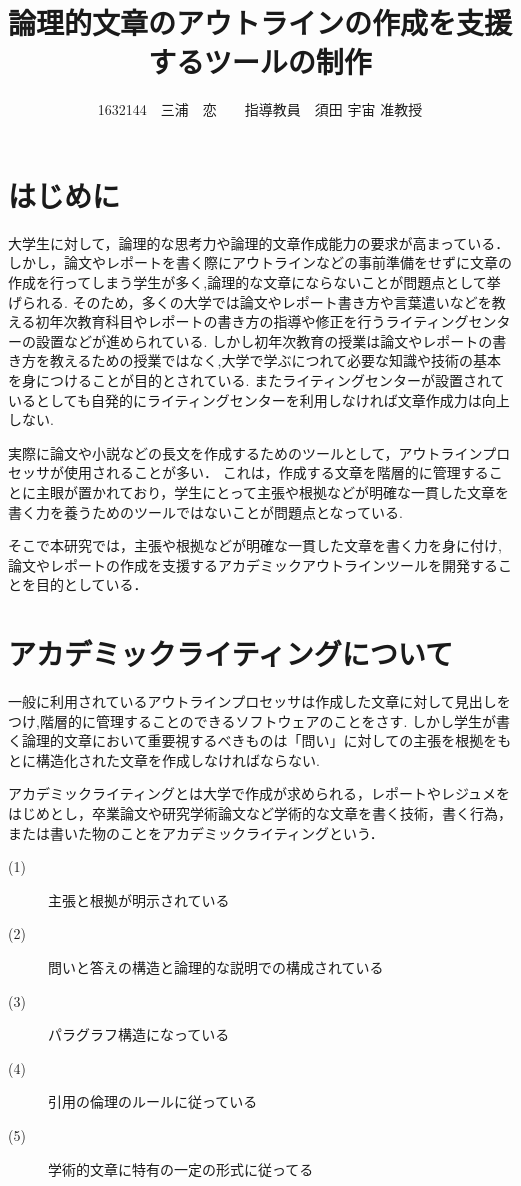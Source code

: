 \documentclass[twocolumn,10pt,a4j]{jsarticle}
\title{論理的文章のアウトラインの作成を支援するツールの制作}
\author{1632144　三浦　恋　　指導教員　須田 宇宙 准教授}
\date{}
\begin{document}
\maketitle

\section{はじめに}

大学生に対して，論理的な思考力や論理的文章作成能力の要求が高まっている．
しかし，論文やレポートを書く際にアウトラインなどの事前準備をせずに文章の作成を行ってしまう学生が多く,論理的な文章にならないことが問題点として挙げられる.
そのため，多くの大学では論文やレポート書き方や言葉遣いなどを教える初年次教育科目やレポートの書き方の指導や修正を行うライティングセンターの設置などが進められている.
しかし初年次教育の授業は論文やレポートの書き方を教えるための授業ではなく,大学で学ぶにつれて必要な知識や技術の基本を身につけることが目的とされている.
またライティングセンターが設置されているとしても自発的にライティングセンターを利用しなければ文章作成力は向上しない.

実際に論文や小説などの長文を作成するためのツールとして，アウトラインプロセッサが使用されることが多い．
これは，作成する文章を階層的に管理することに主眼が置かれており，学生にとって主張や根拠などが明確な一貫した文章を書く力を養うためのツールではないことが問題点となっている.

そこで本研究では，主張や根拠などが明確な一貫した文章を書く力を身に付け,論文やレポートの作成を支援するアカデミックアウトラインツールを開発することを目的としている．

\section{アカデミックライティングについて}
一般に利用されているアウトラインプロセッサは作成した文章に対して見出しをつけ,階層的に管理することのできるソフトウェアのことをさす.
しかし学生が書く論理的文章において重要視するべきものは「問い」に対しての主張を根拠をもとに構造化された文章を作成しなければならない.

アカデミックライティングとは大学で作成が求められる，レポートやレジュメをはじめとし，卒業論文や研究学術論文など学術的な文章を書く技術，書く行為，または書いた物のことをアカデミックライティングという\cite{ren01}．
\begin{description}
  \item[(1)] 主張と根拠が明示されている
  \item[(2)] 問いと答えの構造と論理的な説明での構成されている
  \item[(3)] パラグラフ構造になっている
  \item[(4)] 引用の倫理のルールに従っている
  \item[(5)] 学術的文章に特有の一定の形式に従ってる
\end{description}
\end{document}
